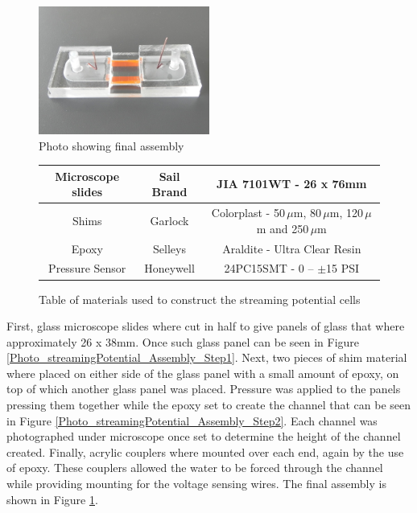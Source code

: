 \begin{figure}[p]
\begin{centering}
\includegraphics[width=0.5\textwidth]{content/pt1/01-PowerHarvesting/Photo_streamingPotential_Assembly_Step3.JPG}
\par\end{centering}

\centering{}\protect\caption{\label{Photo_streamingPotential_Assembly_Step3}Photo showing final
assembly}
\end{figure}
\begin{figure}
\begin{tabular}{|c|c|c|}
\hline
Microscope slides & Sail Brand & JIA 7101WT - 26 x 76mm\tabularnewline
\hline
Shims & Garlock & Colorplast - 50$\,\mu$m, 80$\,\mu$m, 120$\,\mu$m and 250$\,\mu$m\tabularnewline
\hline
Epoxy & Selleys & Araldite - Ultra Clear Resin\tabularnewline
\hline
Pressure Sensor & Honeywell & 24PC15SMT - 0 -- $\pm$15 PSI\tabularnewline
\hline
\end{tabular}

\protect\caption{\label{Table_StreamingCell_MaterialsUsed}Table of materials used
to construct the streaming potential cells}
\end{figure}


First, glass microscope slides where cut in half to give panels of
glass that where approximately 26 x 38mm. Once such glass panel can
be seen in Figure \ref{Photo_streamingPotential_Assembly_Step1}.
Next, two pieces of shim material where placed on either side of the
glass panel with a small amount of epoxy, on top of which another
glass panel was placed. Pressure was applied to the panels pressing
them together while the epoxy set to create the channel that can be
seen in Figure \ref{Photo_streamingPotential_Assembly_Step2}. Each
channel was photographed under microscope once set to determine the
height of the channel created. Finally, acrylic couplers where mounted
over each end, again by the use of epoxy. These couplers allowed the
water to be forced through the channel while providing mounting for
the voltage sensing wires. The final assembly is shown in Figure \ref{Photo_streamingPotential_Assembly_Step3}.


